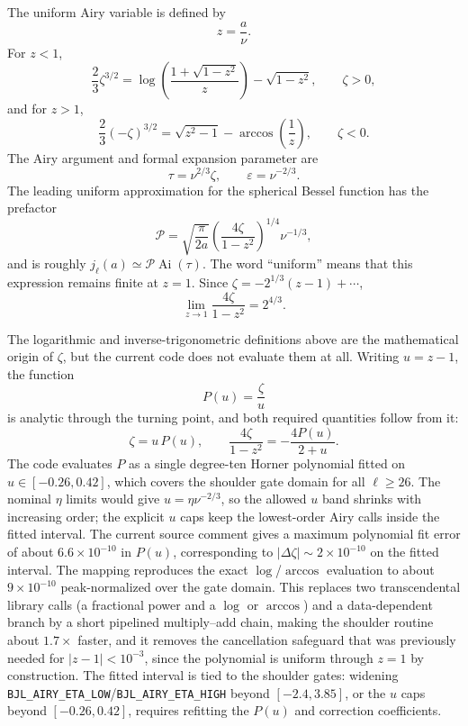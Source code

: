 \documentclass[11pt,a4paper]{article}
\newcommand{\Ai}{\operatorname{Ai}}
\newcommand{\eps}{\varepsilon}
\newcommand{\code}[1]{\texttt{#1}}
\newcommand{\D}{\Delta}
\begin{document}
The uniform Airy variable is defined by
\begin{equation}
  z=\frac{a}{\nu}.
\end{equation}
For $z<1$,
\begin{equation}
  \frac{2}{3}\zeta^{3/2}
  =\log\left(\frac{1+\sqrt{1-z^2}}{z}\right)-\sqrt{1-z^2},
  \qquad \zeta>0,
\end{equation}
and for $z>1$,
\begin{equation}
  \frac{2}{3}(-\zeta)^{3/2}
  =\sqrt{z^2-1}-\arccos\left(\frac{1}{z}\right),
  \qquad \zeta<0.
\end{equation}
The Airy argument and formal expansion parameter are
\begin{equation}
  \tau=\nu^{2/3}\zeta,
  \qquad
  \eps=\nu^{-2/3}.
\end{equation}
The leading uniform approximation for the spherical Bessel function has the prefactor
\begin{equation}
  \mathcal{P}=\sqrt{\frac{\pi}{2a}}
  \left(\frac{4\zeta}{1-z^2}\right)^{1/4}\nu^{-1/3},
\end{equation}
and is roughly $j_\ell(a)\simeq\mathcal{P}\Ai(\tau)$.  The word ``uniform'' means that this expression remains finite at $z=1$.  Since $\zeta=-2^{1/3}(z-1)+\cdots$,
\begin{equation}
  \lim_{z\to1}\frac{4\zeta}{1-z^2}=2^{4/3}.
\end{equation}

The logarithmic and inverse-trigonometric definitions above are the mathematical origin of $\zeta$, but the current code does not evaluate them at all.  Writing $u=z-1$, the function
\begin{equation}
  P(u)=\frac{\zeta}{u}
\end{equation}
is analytic through the turning point, and both required quantities follow from it:
\begin{equation}
  \zeta=u\,P(u),
  \qquad
  \frac{4\zeta}{1-z^2}=-\frac{4P(u)}{2+u}.
\end{equation}
The code evaluates $P$ as a single degree-ten Horner polynomial fitted on $u\in[-0.26,0.42]$, which covers the shoulder gate domain for all $\ell\ge26$.  The nominal $\eta$ limits would give $u=\eta\nu^{-2/3}$, so the allowed $u$ band shrinks with increasing order; the explicit $u$ caps keep the lowest-order Airy calls inside the fitted interval.  The current source comment gives a maximum polynomial fit error of about $6.6\times10^{-10}$ in $P(u)$, corresponding to $|\D\zeta|\sim2\times10^{-10}$ on the fitted interval.  The mapping reproduces the exact $\log$/$\arccos$ evaluation to about $9\times10^{-10}$ peak-normalized over the gate domain.  This replaces two transcendental library calls (a fractional power and a $\log$ or $\arccos$) and a data-dependent branch by a short pipelined multiply--add chain, making the shoulder routine about $1.7\times$ faster, and it removes the cancellation safeguard that was previously needed for $|z-1|<10^{-3}$, since the polynomial is uniform through $z=1$ by construction.  The fitted interval is tied to the shoulder gates: widening \code{BJL\_AIRY\_ETA\_LOW}/\code{BJL\_AIRY\_ETA\_HIGH} beyond $[-2.4,3.85]$, or the $u$ caps beyond $[-0.26,0.42]$, requires refitting the $P(u)$ and correction coefficients.
\end{document}
